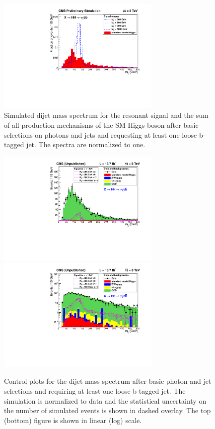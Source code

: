 \begin{figure}[ht]
 \begin{center}
    \includegraphics[width=0.70\textwidth]{figures/objects/DiJetMass_OnlyHiggs.pdf}
 \end{center}
\caption{Simulated dijet mass spectrum for the resonant signal and the sum of all production
mechanisms of the
SM Higgs boson after basic selections on photons and jets and requesting at least one loose
b-tagged jet.
The spectra are normalized to one.}
\label{fig:mjj_onlyhiggs}
\end{figure}

\begin{figure}[ht]
 \begin{center}
   \includegraphics[width=0.70\textwidth]{figures/objects/DiJetMass_ShapeNormalized_sys.pdf}
   \includegraphics[width=0.70\textwidth]{figures/objects/DiJetMass_ShapeNormalized_Log_sys.pdf}
 \end{center}
\caption{Control plots for the dijet mass spectrum after basic photon and jet selections
and requiring at least one loose b-tagged jet. The simulation is normalized to data and
the statistical uncertainty on the number of simulated events is shown in dashed overlay.
The top (bottom) figure is shown in linear (log) scale.}
\label{fig:mjj_controlplot}
\end{figure}

